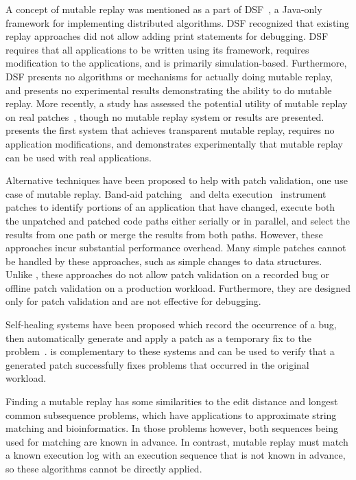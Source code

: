 A concept of mutable replay was mentioned as a part of
DSF~\cite{dsf}, a Java-only framework for implementing distributed 
algorithms. DSF recognized that existing replay approaches did not
allow adding print statements for debugging.  DSF requires that all
applications to be written using its framework, requires modification
to the applications, and is primarily simulation-based. Furthermore, DSF
presents no algorithms or mechanisms for actually doing mutable replay, and
presents no experimental results demonstrating the ability to do mutable
replay.  More recently, a study has assessed the potential utility of
mutable replay on real patches~\cite{mreplay-feas}, though no mutable
replay system or results are presented.
{\dora} presents the first system that achieves transparent mutable replay,
requires no application
modifications, and demonstrates experimentally that
mutable replay can be used with real applications.

Alternative techniques have been proposed to help with patch validation, one
use case of mutable replay.
Band-aid
patching~\cite{bandaid} and delta execution~\cite{delta} instrument patches to
identify portions of an application that have changed, execute both
the unpatched and patched code paths either serially or in parallel,
and select the results from one path or merge the results from both
paths. However, these approaches incur substantial performance overhead.
Many simple patches cannot be handled by these
approaches, such as simple changes to data structures. Unlike {\dora},
these approaches do not allow patch validation on a recorded bug or offline
patch validation on a production workload.
Furthermore, they are designed only for patch validation and are not effective for
debugging.

Self-healing systems have been proposed which 
record the occurrence of a bug, then automatically generate and apply
a patch as a temporary fix to the problem~\cite{assure:asplos09}.
{\dora} is complementary
to these systems and can be used to
verify that a generated patch successfully fixes
problems that occurred in the original workload.

Finding a mutable replay has some similarities
to the edit distance and longest common subsequence
problems, which have applications to approximate string matching and
bioinformatics. In those problems however, both
sequences being used for matching are known in advance. In contrast,
mutable replay must match a known execution log with an
execution sequence that is not known in advance, so these algorithms cannot be
directly applied.
